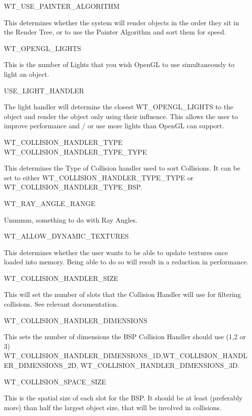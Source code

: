 \par
 WT\_\-USE\_\-PAINTER\_\-ALGORITHM
\begin{DoxyItemize}
\item This determines whether the system will render objects in the order they sit in the Render Tree, or to use the Painter Algorithm and sort them for speed.\par
 WT\_\-OPENGL\_\-LIGHTS
\item This is the number of Lights that you wish OpenGL to use simultaneously to light an object.\par
 USE\_\-LIGHT\_\-HANDLER
\item The light handler will determine the closest WT\_\-OPENGL\_\-LIGHTS to the object and render the object only using their influence. This allows the user to improve performance and / or use more lights than OpenGL can support.\par
 WT\_\-COLLISION\_\-HANDLER\_\-TYPE WT\_\-COLLISION\_\-HANDLER\_\-TYPE\_\-TYPE
\item This determines the Type of Collision handler used to sort Collisions. It can be set to either WT\_\-COLLISION\_\-HANDLER\_\-TYPE\_\-TYPE or WT\_\-COLLISION\_\-HANDLER\_\-TYPE\_\-BSP.\par
 WT\_\-RAY\_\-ANGLE\_\-RANGE
\item Ummmm, something to do with Ray Angles.\par
 WT\_\-ALLOW\_\-DYNAMIC\_\-TEXTURES
\item This determines whether the user wants to be able to update textures once loaded into memory. Being able to do so will result in a reduction in performance.\par
 WT\_\-COLLISION\_\-HANDLER\_\-SIZE
\item This will set the number of slots that the Collision Handler will use for filtering collisions. See relevant documentation.\par
 WT\_\-COLLISION\_\-HANDLER\_\-DIMENSIONS
\item This sets the number of dimensions the BSP Collision Handler should use (1,2 or 3) WT\_\-COLLISION\_\-HANDLER\_\-DIMENSIONS\_\-1D,WT\_\-COLLISION\_\-HANDLER\_\-DIMENSIONS\_\-2D, WT\_\-COLLISION\_\-HANDLER\_\-DIMENSIONS\_\-3D.\par
 WT\_\-COLLISION\_\-SPACE\_\-SIZE
\item This is the spatial size of each slot for the BSP. It should be at least (preferably more) than half the largest object size, that will be involved in collisions.\par

\end{DoxyItemize}
